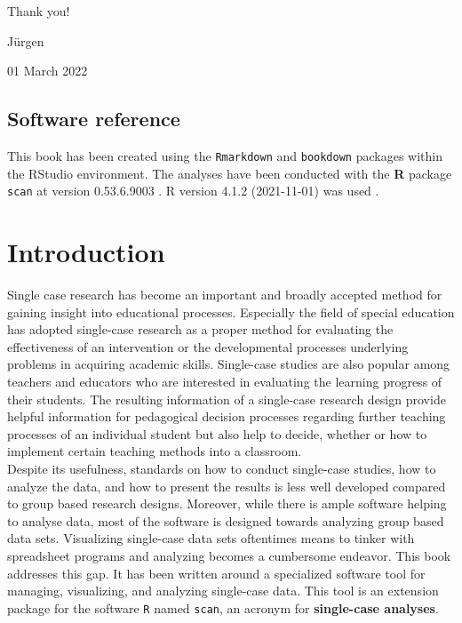 \documentclass[
]{book}
\begin{document}
Thank you!

Jürgen

01 March 2022

\hypertarget{software-reference}{%
\section*{Software reference}\label{software-reference}}

This book has been created using the \texttt{Rmarkdown} \citep{R-rmarkdown} and \texttt{bookdown} \citep{R-bookdown} packages within the RStudio \citep{RStudio} environment. The analyses have been conducted with the \textbf{R} package \texttt{scan} at version 0.53.6.9003 \citep{R-scan}. R version 4.1.2 (2021-11-01) was used \citep{R-base}.

\hypertarget{introduction}{%
\chapter{Introduction}\label{introduction}}

Single case research has become an important and broadly accepted method for gaining insight into educational processes. Especially the field of special education has adopted single-case research as a proper method for evaluating the effectiveness of an intervention or the developmental processes underlying problems in acquiring academic skills. Single-case studies are also popular among teachers and educators who are interested in evaluating the learning progress of their students. The resulting information of a single-case research design provide helpful information for pedagogical decision processes regarding further teaching processes of an individual student but also help to decide, whether or how to implement certain teaching methods into a classroom.\\
Despite its usefulness, standards on how to conduct single-case studies, how to analyze the data, and how to present the results is less well developed compared to group based research designs. Moreover, while there is ample software helping to analyse data, most of the software is designed towards analyzing group based data sets. Visualizing single-case data sets oftentimes means to tinker with spreadsheet programs and analyzing becomes a cumbersome endeavor. This book addresses this gap. It has been written around a specialized software tool for managing, visualizing, and analyzing single-case data. This tool is an extension package for the software \texttt{R} \citep{R-base} named \texttt{scan}, an acronym for \textbf{single-case analyses}.
\end{document}

